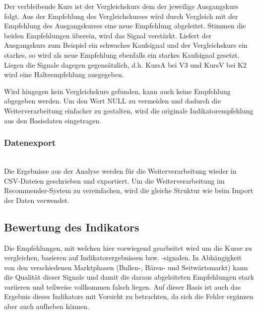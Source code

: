 Der verbleibende Kurs ist der Vergleichskurs dem der jeweilige Ausgangskurs folgt. Aus der Empfehlung des Vergleichskurses wird durch Vergleich mit der Empfehlung des Ausgangskurses eine neue Empfehlung abgeleitet. Stimmen die beiden Empfehlungen überein, wird das Signal verstärkt. Liefert der Ausgangskurs zum Beispiel ein schwaches Kaufsignal und der Vergleichskurs ein starkes, so wird als neue Empfehlung ebenfalls ein starkes Kaufsignal gesetzt. Liegen die Signale dagegen gegensätzlich, d.h. KursA bei V3 und KursV bei K2 wird eine Halteempfehlung ausgegeben.

Wird hingegen kein Vergleichskurs gefunden, kann auch keine Empfehlung abgegeben werden. Um den Wert NULL zu vermeiden und dadurch die Weiterverarbeitung einfacher zu gestalten, wird die originale Indikatorempfehlung aus den Basisdaten eingetragen.  

\subsubsection{Datenexport\nopunct}~\\
Die Ergebnisse aus der Analyse werden für die Weiterverarbeitung wieder in CSV-Dateien geschrieben und exportiert. Um die Weiterverarbeitung im Recommender-System zu vereinfachen, wird die gleiche Struktur wie beim Import der Daten verwendet. 

\subsection{Bewertung des Indikators}
Die Empfehlungen, mit welchen hier vorwiegend gearbeitet wird um die Kurse zu vergleichen, basieren auf Indikatorergebnissen bzw. -signalen. In Abhängigkeit von den verschiedenen Marktphasen (Bullen-, Bären- und Seitwärtsmarkt) kann die Qualität dieser Signale und damit die daraus abgeleiteten Empfehlungen stark variieren und teilweise vollkommen falsch liegen. Auf dieser Basis ist auch das Ergebnis dieses Indikators mit Vorsicht zu betrachten, da sich die Fehler ergänzen aber auch aufheben können. 


